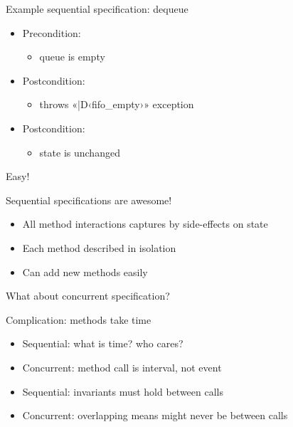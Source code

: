 \documentclass{beamer}
\begin{document}
\begin{frame}[fragile]{Example sequential specification: dequeue}{}
  \begin{itemize}
    \item Precondition:
      \begin{itemize}
        \item queue is empty
      \end{itemize}
    \item Postcondition:
      \begin{itemize}
        \item throws «|D‹fifo_empty›» exception
      \end{itemize}
    \item Postcondition:
      \begin{itemize}
        \item state is unchanged
      \end{itemize}
  \end{itemize}
  Easy!
\end{frame}

\begin{frame}{Sequential specifications are awesome!}{}
  \begin{itemize}
    \item All method interactions captures by side-effects on state
    \item Each method described in isolation
    \item Can add new methods easily
  \end{itemize}
  \pause
  What about concurrent specification?
\end{frame}

\begin{frame}{Complication: methods take time}{}
  \begin{itemize}
    \item Sequential: what is time? who cares?
    \item Concurrent: method call is \alert{interval}, not \alert{event}
  \end{itemize}
  \pause
  \begin{itemize}
    \item Sequential: invariants must hold \alert{between} calls
    \item Concurrent: overlapping means might \alert{never} be between
      calls
  \end{itemize}
\end{frame}
\end{document}
